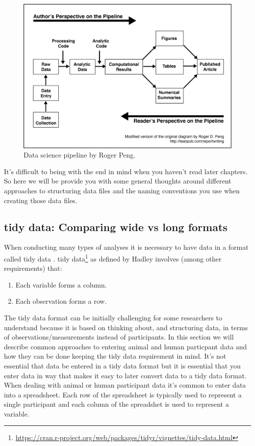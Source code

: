 \documentclass[
]{krantz}
\providecommand{\tightlist}{%
  \setlength{\itemsep}{0pt}\setlength{\parskip}{0pt}}
\renewcommand{\href}[2]{#2\footnote{\url{#1}}}
\begin{document}
\begin{figure}
\includegraphics[width=0.85\linewidth]{ch_enter_load/images/pipeline} \caption{Data science pipeline by Roger Peng.}\label{fig:pipeline}
\end{figure}

It's difficult to being with the end in mind when you haven't read later chapters. So here we will be provide you with some general thoughts around different approaches to structuring data files and the naming conventions you use when creating those data files.

\hypertarget{tidy-data-comparing-wide-vs-long-formats}{%
\subsection{tidy data: Comparing wide vs long formats}\label{tidy-data-comparing-wide-vs-long-formats}}

When conducting many types of analyses it is necessary to have data in a format called tidy data \citep{tidy-data}. \href{https://cran.r-project.org/web/packages/tidyr/vignettes/tidy-data.html}{tidy data} as defined by Hadley involves (among other requirements) that:

\begin{enumerate}
\def\labelenumi{\arabic{enumi}.}
\tightlist
\item
  Each variable forms a column.
\item
  Each observation forms a row.
\end{enumerate}

The tidy data format can be initially challenging for some researchers to understand because it is based on thinking about, and structuring data, in terms of observations/measurements instead of participants. In this section we will describe common approaches to entering animal and human particpant data and how they can be done keeping the tidy data requirement in mind. It's not essential that data be entered in a tidy data format but it is essential that you enter data in way that makes it easy to later convert data to a tidy data format. When dealing with animal or human participant data it's common to enter data into a spreadsheet. Each row of the spreadsheet is typically used to represent a single participant and each column of the spreadshet is used to represent a variable.
\end{document}
